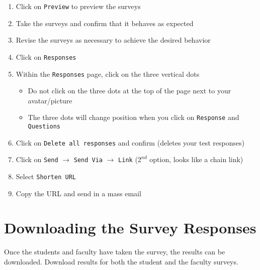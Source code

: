 \begin{enumerate}
	\item Click on \texttt{Preview} to preview the surveys
	\item Take the surveys and confirm that it behaves as expected
	\item Revise the surveys as necessary to achieve the desired behavior
	\item Click on \texttt{Responses}
	\item Within the \texttt{Responses} page, click on the three vertical dots
		\begin{itemize}
			\item Do not click on the three dots at the top of the page next to your avatar/picture
			\item The three dots will change position when you click on \texttt{Response} and \texttt{Questions}
		\end{itemize}
	\item Click on \texttt{Delete all responses} and confirm (deletes your test responses)
	\item Click on \texttt{Send} $\rightarrow$ \texttt{Send Via} $\rightarrow$ \texttt{Link} ($2^{nd}$ option, looks like a chain link)
	\item Select \texttt{Shorten URL}
	\item Copy the URL and send in a mass email
\end{enumerate}


%
%
\section{Downloading the Survey Responses}

Once the students and faculty have taken the survey, the results can be downloaded.  Download results for both the student and the faculty surveys.

